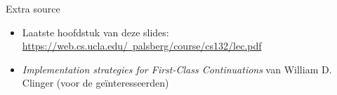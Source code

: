 \documentclass{beamer}
\begin{document}
\begin{frame}{Extra source}
	\begin{itemize}
	    \item Laatste hoofdstuk van deze slides: \href{https://web.cs.ucla.edu/~palsberg/course/cs132/lec.pdf}{https://web.cs.ucla.edu/~palsberg/course/cs132/lec.pdf}
	    \item \emph{Implementation strategies for First-Class Continuations} van William D. Clinger (voor de geïnteresseerden)
	\end{itemize}
\end{frame}
\end{document}
